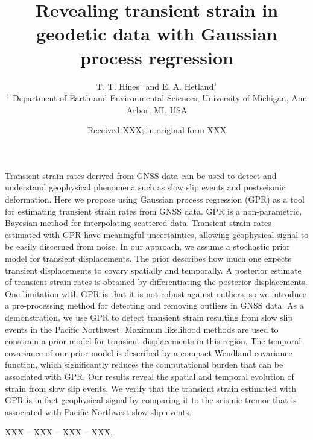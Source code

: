 \documentclass[extra,mreferee]{gji}
\title[Transient strain in geodetic data]
      {Revealing transient strain in geodetic data with Gaussian process regression}
\author[T. T. Hines and E. A. Hetland]
       {T. T. Hines$^1$ and E. A. Hetland$^1$ \\
        $^1$ Department of Earth and Environmental Sciences, University of Michigan, Ann Arbor, MI, USA}
\date{Received XXX; in original form XXX}
\begin{document}
\label{firstpage}

\maketitle

\begin{summary}
Transient strain rates derived from GNSS data can be used to detect and understand geophysical phenomena such as slow slip events and postseismic deformation. Here we propose using Gaussian process regression (GPR) as a tool for estimating transient strain rates from GNSS data. GPR is a non-parametric, Bayesian method for interpolating scattered data. Transient strain rates estimated with GPR have meaningful uncertainties, allowing geophysical signal to be easily discerned from noise. In our approach, we assume a stochastic prior model for transient displacements. The prior describes how much one expects transient displacements to covary spatially and temporally. A posterior estimate of transient strain rates is obtained by differentiating the posterior displacements. One limitation with GPR is that it is not robust against outliers, so we introduce a pre-processing method for detecting and removing outliers in GNSS data. As a demonstration, we use GPR to detect transient strain resulting from slow slip events in the Pacific Northwest. Maximum likelihood methods are used to constrain a prior model for transient displacements in this region. The temporal covariance of our prior model is described by a compact Wendland covariance function, which significantly reduces the computational burden that can be associated with GPR. Our results reveal the spatial and temporal evolution of strain from slow slip events. We verify that the transient strain estimated with GPR is in fact geophysical signal by comparing it to the seismic tremor that is associated with Pacific Northwest slow slip events.
\end{summary}

\begin{keywords}
 XXX -- XXX -- XXX -- XXX.
\end{keywords}
\end{document}
